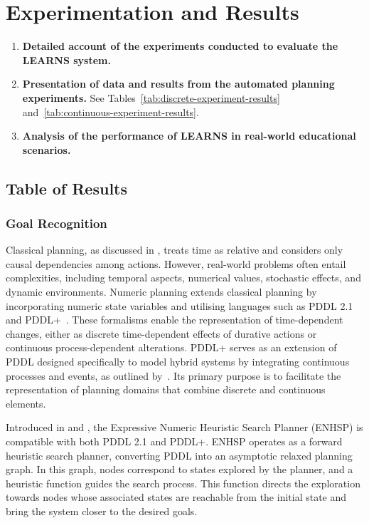 \section{Experimentation and Results}
\begin{enumerate}
    \item \textbf{Detailed account of the experiments conducted to evaluate the LEARNS system.}
    \item \textbf{Presentation of data and results from the automated planning experiments.} See Tables~\ref{tab:discrete-experiment-results} and~\ref{tab:continuous-experiment-results}.
    \item \textbf{Analysis of the performance of LEARNS in real-world educational scenarios.}
\end{enumerate}

\subsection{Table of Results}

\subsubsection{Goal Recognition}
Classical planning, as discussed in \citet{Fox2003}, treats time as relative and considers only causal dependencies among actions. However, real-world problems often entail complexities, including temporal aspects, numerical values, stochastic effects, and dynamic environments. Numeric planning extends classical planning by incorporating numeric state variables and utilising languages such as PDDL 2.1~\cite{Fox2003} and PDDL+~\cite{Fox2006}. These formalisms enable the representation of time-dependent changes, either as discrete time-dependent effects of durative actions or continuous process-dependent alterations. PDDL+ serves as an extension of PDDL designed specifically to model hybrid systems by integrating continuous processes and events, as outlined by~\citet{Haslum2019}. Its primary purpose is to facilitate the representation of planning domains that combine discrete and continuous elements.

Introduced in \citet{Scala2016} and \citet{ScalaHaslum2016}, the Expressive Numeric Heuristic Search Planner (ENHSP) is compatible with both PDDL 2.1 and PDDL+. ENHSP operates as a forward heuristic search planner, converting PDDL into an asymptotic relaxed planning graph. In this graph, nodes correspond to states explored by the planner, and a heuristic function guides the search process. This function directs the exploration towards nodes whose associated states are reachable from the initial state and bring the system closer to the desired goals.

